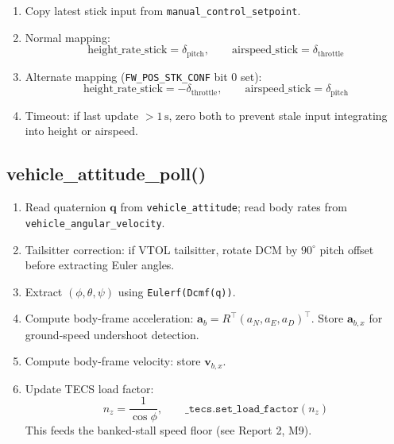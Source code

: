 \documentclass[12pt,a4paper]{article}
\begin{document}
\begin{enumerate}
  \item Copy latest stick input from \texttt{manual\_control\_setpoint}.
  \item Normal mapping:
        \begin{equation}
          \text{height\_rate\_stick} = \delta_{\text{pitch}}, \qquad
          \text{airspeed\_stick} = \delta_{\text{throttle}}
        \end{equation}
  \item Alternate mapping (\texttt{FW\_POS\_STK\_CONF} bit 0 set):
        \begin{equation}
          \text{height\_rate\_stick} = -\delta_{\text{throttle}}, \qquad
          \text{airspeed\_stick} = \delta_{\text{pitch}}
        \end{equation}
  \item Timeout: if last update $> 1\,\text{s}$, zero both to prevent
        stale input integrating into height or airspeed.
\end{enumerate}

\subsection{vehicle\_attitude\_poll()}

\begin{enumerate}
  \item Read quaternion $\mathbf{q}$ from \texttt{vehicle\_attitude};
        read body rates from \texttt{vehicle\_angular\_velocity}.
  \item Tailsitter correction: if VTOL tailsitter, rotate DCM by
        $90^\circ$ pitch offset before extracting Euler angles.
  \item Extract $(\phi, \theta, \psi)$ using \texttt{Eulerf(Dcmf(q))}.
  \item Compute body-frame acceleration:
        $\mathbf{a}_b = R^\top (a_N, a_E, a_D)^\top$.
        Store $\mathbf{a}_{b,x}$ for ground-speed undershoot detection.
  \item Compute body-frame velocity: store $\mathbf{v}_{b,x}$.
  \item Update TECS load factor:
        \begin{equation}
          n_z = \frac{1}{\cos\phi}, \qquad
          \texttt{\_tecs.set\_load\_factor}(n_z)
        \end{equation}
        This feeds the banked-stall speed floor (see Report 2, M9).
\end{enumerate}
\end{document}

